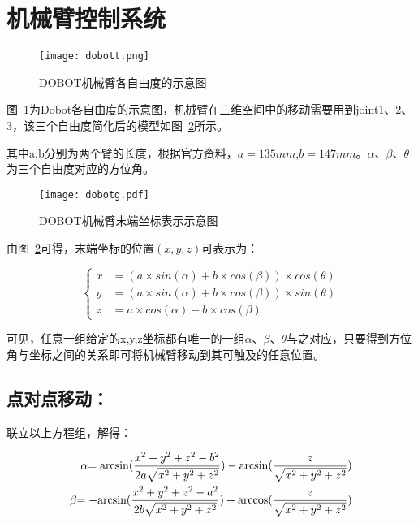 \section{机械臂控制系统}

\begin{figure}[htbp]
\small
\centering
\texttt{[image: dobott.png]}
\caption{DOBOT机械臂各自由度的示意图} 
\label{dobott}
\end{figure}

图~\ref{dobott}为Dobot各自由度的示意图，机械臂在三维空间中的移动需要用到joint1、2、3，该三个自由度简化后的模型如图~\ref{dobotg}所示。

其中a,b分别为两个臂的长度，根据官方资料，$a=135mm$,$b=147mm$。$\alpha$、$\beta$、$\theta$ 为三个自由度对应的方位角。

\begin{figure}[htbp]
\small
\centering
\texttt{[image: dobotg.pdf]}
\caption{DOBOT机械臂末端坐标表示示意图} 
\label{dobotg}
\end{figure}

由图~\ref{dobotg}可得，末端坐标的位置$(x,y,z)$可表示为：

\begin{displaymath}
	\left\{  
\begin{aligned}
x&=(a \times sin(\alpha)+b \times cos(\beta))\times cos(\theta)\\
y&=(a \times sin(\alpha)+b \times cos(\beta)) \times sin(\theta)\\
z&=a \times cos(\alpha)-b \times cos(\beta)
\end{aligned}
	\right.	
\end{displaymath}

可见，任意一组给定的x,y,z坐标都有唯一的一组$\alpha$、$\beta$、$\theta$与之对应，只要得到方位角与坐标之间的关系即可将机械臂移动到其可触及的任意位置。

\subsection{点对点移动：}
联立以上方程组，解得：

\begin{align}
\alpha {\rm{ = arcsin(}}\frac{{{x^2} + {y^2} + {z^2} - {b^2}}}{{2a\sqrt {{x^2} + {y^2} + {z^2}} }}) - {\rm{arcsin(}}\frac{z}{{\sqrt {{x^2} + {y^2} + {z^2}} }})\\
\beta {\rm{ =  - arcsin(}}\frac{{{x^2} + {y^2} + {z^2} - {a^2}}}{{2b\sqrt {{x^2} + {y^2} + {z^2}} }}) + {\rm{arccos(}}\frac{z}{{\sqrt {{x^2} + {y^2} + {z^2}} }})
\end{align}

